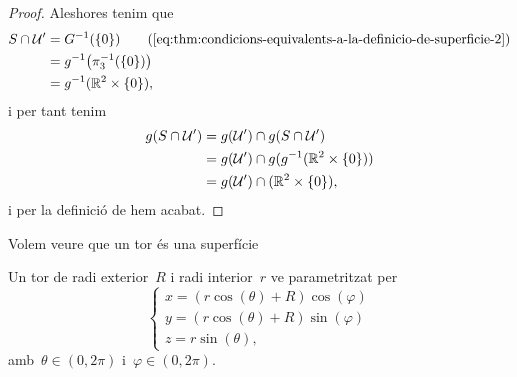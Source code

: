 \documentclass[../geometria-diferencial.tex]{subfiles}
\begin{document}
\begin{proof}
        Aleshores tenim que
        \begin{align*}
            S\cap\obert{U}'&=G^{-1}(\{0\}) \tag{\ref{eq:thm:condicions-equivalents-a-la-definicio-de-superficie-2}}\\
            &=g^{-1}\big(\pi_{3}^{-1}(\{0\})\big) \\
            &=g^{-1}(\mathbb{R}^{2}\times\{0\}),
        \end{align*}
        i per tant tenim
        \begin{align*}
            g(S\cap\mathcal{U}')&=g(\mathcal{U}')\cap g(S\cap\mathcal{U}') \\
            &=g(\mathcal{U}')\cap g(g^{-1}(\mathbb{R}^{2}\times\{0\})) \\
            &=g(\mathcal{U}')\cap(\mathbb{R}^{2}\times\{0\}),
        \end{align*}
        i per la definició de  hem acabat.
    \end{proof}
    \begin{example}
        \label{ex:un-tor-es-una-superficie}
        Volem veure que un tor és una superfície
    \end{example}
    \begin{solution}
        Un tor de radi exterior~\(R\) i radi interior~\(r\) ve parametritzat per
        \[\begin{cases*}
            x=(r\cos(\theta)+R)\cos(\varphi) \\
            y=(r\cos(\theta)+R)\sin(\varphi) \\
            z=r\sin(\theta),
        \end{cases*}\]
        amb~\(\theta\in(0,2\pi)\) i~\(\varphi\in(0,2\pi)\).
    \end{solution}
\end{document}
